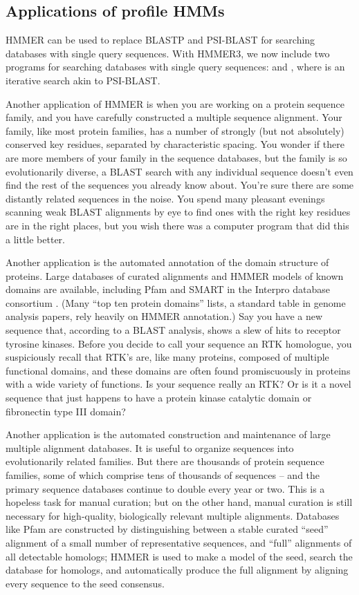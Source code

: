 \subsection{Applications of profile HMMs}

HMMER can be used to replace BLASTP and PSI-BLAST for searching
databases with single query sequences. With HMMER3, we now include two
programs for searching databases with single query sequences:
 and , where  is an
iterative search akin to PSI-BLAST.

Another application of HMMER is when you are working on a protein
sequence family, and you have carefully constructed a multiple
sequence alignment. Your family, like most protein families, has a
number of strongly (but not absolutely) conserved key residues,
separated by characteristic spacing. You wonder if there are more
members of your family in the sequence databases, but the family is so
evolutionarily diverse, a BLAST search with any individual sequence
doesn't even find the rest of the sequences you already know
about. You're sure there are some distantly related sequences in the
noise. You spend many pleasant evenings scanning weak BLAST alignments
by eye to find ones with the right key residues are in the right
places, but you wish there was a computer program that did this a
little better.

Another application is the automated annotation of the domain
structure of proteins. Large databases of curated alignments and HMMER
models of known domains are available, including Pfam \citep{Finn10}
and SMART \citep{Letunic06} in the Interpro database consortium
\citep{Mulder03}. (Many ``top ten protein domains'' lists, a standard
table in genome analysis papers, rely heavily on HMMER annotation.)
Say you have a new sequence that, according to a BLAST analysis, shows
a slew of hits to receptor tyrosine kinases. Before you decide to call
your sequence an RTK homologue, you suspiciously recall that RTK's
are, like many proteins, composed of multiple functional domains, and
these domains are often found promiscuously in proteins with a wide
variety of functions. Is your sequence really an RTK? Or is it a novel
sequence that just happens to have a protein kinase catalytic domain
or fibronectin type III domain?

Another application is the automated construction and maintenance
of large multiple alignment databases.  It is useful to organize
sequences into evolutionarily related families. But there are
thousands of protein sequence families, some of which comprise tens of
thousands of sequences -- and the primary sequence databases continue
to double every year or two. This is a hopeless task for manual
curation; but on the other hand, manual curation is still necessary
for high-quality, biologically relevant multiple alignments. Databases
like Pfam \citep{Finn10} are constructed by distinguishing between a
stable curated ``seed'' alignment of a small number of representative
sequences, and ``full'' alignments of all detectable homologs; HMMER
is used to make a model of the seed, search the database for homologs,
and automatically produce the full alignment by aligning every
sequence to the seed consensus.

